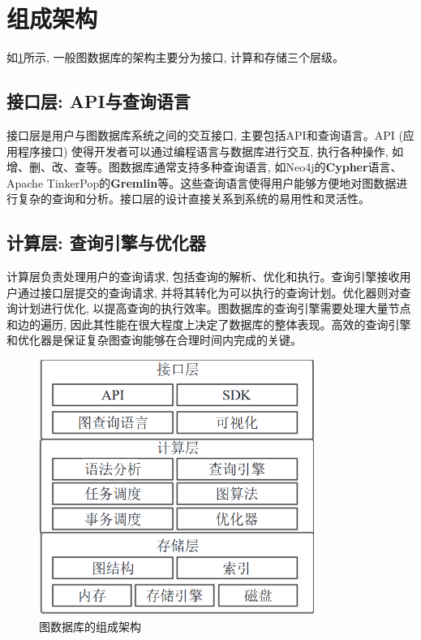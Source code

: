 \section{组成架构}

如\cref{fig:graph_db_architecture}所示, 一般图数据库的架构主要分为接口, 计算和存储三个层级。



\subsection{接口层: API与查询语言}

接口层是用户与图数据库系统之间的交互接口, 主要包括API和查询语言。API (应用程序接口) 使得开发者可以通过编程语言与数据库进行交互, 执行各种操作, 如增、删、改、查等。图数据库通常支持多种查询语言, 如Neo4j的\textbf{Cypher}语言、Apache TinkerPop的\textbf{Gremlin}等。这些查询语言使得用户能够方便地对图数据进行复杂的查询和分析。接口层的设计直接关系到系统的易用性和灵活性。


\subsection{计算层: 查询引擎与优化器}

计算层负责处理用户的查询请求, 包括查询的解析、优化和执行。查询引擎接收用户通过接口层提交的查询请求, 并将其转化为可以执行的查询计划。优化器则对查询计划进行优化, 以提高查询的执行效率。图数据库的查询引擎需要处理大量节点和边的遍历, 因此其性能在很大程度上决定了数据库的整体表现。高效的查询引擎和优化器是保证复杂图查询能够在合理时间内完成的关键。

\begin{figure}[H]
	\centering
	\includegraphics[width=0.8\textwidth]{images/3.png}
	\caption{图数据库的组成架构}
	\label{fig:graph_db_architecture}
\end{figure}

